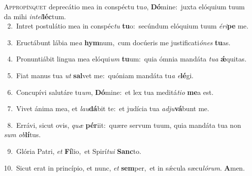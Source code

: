 \lettrine{\initial\textcolor{\initialcolor}{A}}{ppropínquet} deprecátio mea in conspéctu tu\-\textit{o}\-, \textbf{Dó}\-mine:~\star juxta elóquium tuum da mihi \textit{in}\-\textit{tel}\textbf{léc}tum.\\
{\numbfont\textcolor{\numbcolor}{~2.}}~Intret postulátio mea in conspéc\textit{tu} \textbf{tu}\-o:~\star secúndum elóquium tuum \textit{é}\-\textit{ri}\textbf{pe} me.\par
{\numbfont\textcolor{\numbcolor}{~3.}}~Eructábunt lábia me\textit{a} \textbf{hym}\-num,~\star cum docúeris me justificati\-\textit{ó}\-\textit{nes} \textbf{tu}\-as.\par
{\numbfont\textcolor{\numbcolor}{~4.}}~Pronuntiábit lingua mea elóqui\textit{um} \textbf{tu}\-um:~\star quia ómnia mandáta \textit{tu}\-\textit{a} \textbf{ǽ}\-quitas.\par
{\numbfont\textcolor{\numbcolor}{~5.}}~Fiat manus tua \textit{ut} \textbf{sal}\-vet me:~\star quóniam mandáta tu\textit{a} \textit{e}\-\textbf{lé}gi.\par
{\numbfont\textcolor{\numbcolor}{~6.}}~Concupívi salutáre tu\-\textit{um}\-, \textbf{Dó}\-mine:~\star et lex tua meditá\-\textit{ti}\-\textit{o} \textbf{me}\-a est.\par
{\numbfont\textcolor{\numbcolor}{~7.}}~Vivet ánima mea, et \textit{lau}\-\textbf{dá}bit te:~\star et judícia tua \textit{ad}\-\textit{ju}\textbf{vá}bunt me.\par
{\numbfont\textcolor{\numbcolor}{~8.}}~Errávi, sicut ovis, \textit{quæ} \textbf{pér}\-iit:~\star quære servum tuum, quia mandáta tua non \textit{sum} \textit{ob}\-\textbf{lí}tus.\par
{\numbfont\textcolor{\numbcolor}{~9.}}~Glória Patri, \textit{et} \textbf{Fí}\-lio,~\star et Spirí\-\textit{tu}\-\textit{i} \textbf{Sanc}\-to.\par
{\numbfont\textcolor{\numbcolor}{10.}}~Sicut erat in princípio, et nunc, \textit{et} \textbf{sem}\-per,~\star et in sǽcula sæcu\-\textit{ló}\-\textit{rum}. \textbf{A}\-men.\par

